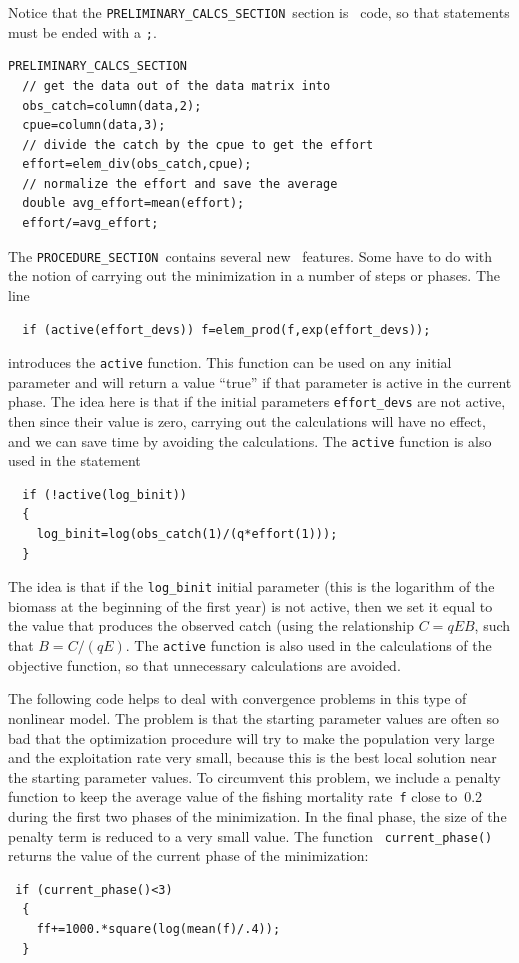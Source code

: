\documentclass{admbmanual}
\newcommand\PCS{\texttt{PRELIMINARY\_CALCS\_SECTION}}
\newcommand\PROS{\texttt{PROCEDURE\_SECTION}}
\begin{document}
Notice that the \PCS\ section is \cplus\ code, so that statements must be ended
with a \texttt{;}.
\begin{lstlisting}
PRELIMINARY_CALCS_SECTION
  // get the data out of the data matrix into
  obs_catch=column(data,2);
  cpue=column(data,3);
  // divide the catch by the cpue to get the effort
  effort=elem_div(obs_catch,cpue);
  // normalize the effort and save the average
  double avg_effort=mean(effort);
  effort/=avg_effort;
\end{lstlisting}
The \PROS\ contains several new \ADM\ features. Some have to do with the notion
of carrying out the minimization in a number of steps or phases. The line
\begin{lstlisting}
  if (active(effort_devs)) f=elem_prod(f,exp(effort_devs));
\end{lstlisting}
introduces the \texttt{active} function. This function can be used on any
initial parameter and will return a value ``true'' if that parameter is active
in the current phase. The idea here is that if the initial parameters
\texttt{effort\_devs} are not active, then since their value is zero, carrying
out the calculations will have no effect, and we can save time by avoiding the
calculations. The \texttt{active} function is also used in the statement
\begin{lstlisting}
  if (!active(log_binit))
  {
    log_binit=log(obs_catch(1)/(q*effort(1)));
  }
\end{lstlisting}
The idea is that if the \texttt{log\_binit} initial parameter (this is the
logarithm of the biomass at the beginning of the first year) is not active, then
we set it equal to the value that produces the observed catch (using the
relationship $C=qEB$, such that $B=C/(qE)$. The \texttt{active} function is also
used in the calculations of the objective function, so that unnecessary
calculations are avoided.

The following code helps to deal with convergence problems in this type of
nonlinear model. The problem is that the starting parameter values are often so
bad that the optimization procedure will try to make the population very large
and the exploitation rate very small, because this is the best local solution
near the starting parameter values. To circumvent this problem, we include a
penalty function to keep the average value of the fishing mortality
rate~\texttt{f} close to~0.2 during the first two phases of the minimization. In
the final phase, the size of the penalty term is reduced to a very small value.
The function \texttt{ current\_phase()} returns the value of the current phase
of the minimization:
\begin{lstlisting}
 if (current_phase()<3)
  {
    ff+=1000.*square(log(mean(f)/.4));
  }
\end{lstlisting}
\end{document}
